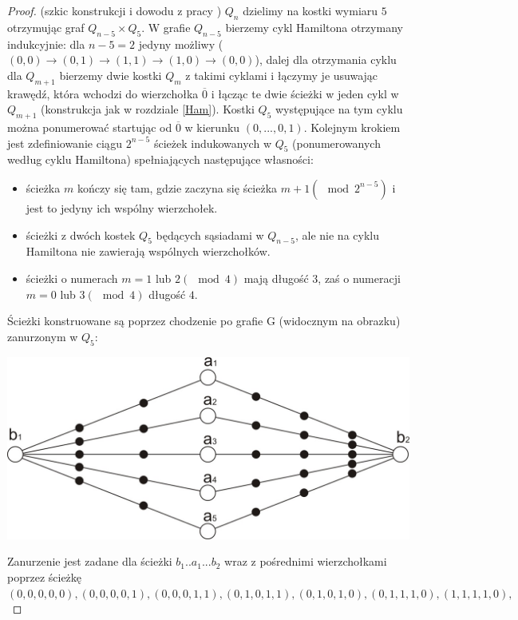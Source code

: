 \documentclass{pracamgr}
\begin{document}
     \begin{proof}(szkic konstrukcji i dowodu z pracy \cite{Snake2})
      $Q_n$ dzielimy na kostki wymiaru $5$ otrzymując graf $Q_{n-5}\times Q_5$. W grafie $Q_{n-5}$ bierzemy cykl Hamiltona otrzymany indukcyjnie:
      dla $n-5=2$ jedyny możliwy ($(0,0)\rightarrow(0,1)\rightarrow(1,1)\rightarrow(1,0)\rightarrow(0,0)$),
      dalej dla otrzymania cyklu dla $Q_{m+1}$ bierzemy dwie kostki $Q_m$ z takimi cyklami i łączymy je usuwając krawędź, która wchodzi do wierzchołka
      $\overline{0}$ i łącząc te dwie ścieżki w jeden cykl w $Q_{m+1}$ (konstrukcja jak w rozdziale \ref{Ham}).
      Kostki $Q_5$ występujące na tym cyklu można ponumerować startując od $\overline{0}$ w kierunku $(0,...,0,1)$.\newline
      Kolejnym krokiem jest zdefiniowanie ciągu $2^{n-5}$ ścieżek indukowanych w $Q_5$ (ponumerowanych według cyklu Hamiltona)
      spełniających następujące własności:
      \begin{itemize}
       \item ścieżka $m$ kończy się tam, gdzie zaczyna się ścieżka $m+1 (\mod 2^{n-5})$ i jest to jedyny ich wspólny wierzchołek.
       \item ścieżki z dwóch kostek $Q_5$ będących sąsiadami w $Q_{n-5}$, ale nie na cyklu Hamiltona nie zawierają wspólnych wierzchołków.
       \item ścieżki o numerach $m=1$ lub $2(\mod 4)$ mają długość $3$, zaś o numeracji $m=0$ lub $3(\mod 4)$ długość $4$.
      \end{itemize}
      Ścieżki konstruowane są poprzez chodzenie po grafie G (widocznym na obrazku) zanurzonym w $Q_5$:
      \begin{center}
       \includegraphics[scale=1]{img/snake_G.jpg}
      \end{center}
      Zanurzenie jest zadane dla ścieżki $b_1..a_1...b_2$ wraz z pośrednimi wierzchołkami poprzez ścieżkę
      $(0,0,0,0,0),(0,0,0,0,1),(0,0,0,1,1),(0,1,0,1,1),(0,1,0,1,0),(0,1,1,1,0),(1,1,1,1,0),$\newline

\end{proof}
\end{document}
